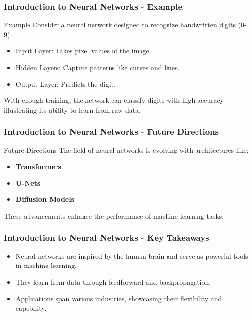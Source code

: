 \documentclass[aspectratio=169]{beamer}
\begin{document}
\begin{frame}[fragile]
    \frametitle{Introduction to Neural Networks - Example}
    \begin{block}{Example}
        Consider a neural network designed to recognize handwritten digits (0-9). 
        \begin{itemize}
            \item Input Layer: Takes pixel values of the image.
            \item Hidden Layers: Capture patterns like curves and lines.
            \item Output Layer: Predicts the digit.
        \end{itemize}
        With enough training, the network can classify digits with high accuracy, illustrating its ability to learn from raw data.
    \end{block}
\end{frame}

\begin{frame}[fragile]
    \frametitle{Introduction to Neural Networks - Future Directions}
    \begin{block}{Future Directions}
        The field of neural networks is evolving with architectures like:
        \begin{itemize}
            \item \textbf{Transformers}
            \item \textbf{U-Nets}
            \item \textbf{Diffusion Models}
        \end{itemize}
        These advancements enhance the performance of machine learning tasks.
    \end{block}
\end{frame}

\begin{frame}[fragile]
    \frametitle{Introduction to Neural Networks - Key Takeaways}
    \begin{itemize}
        \item Neural networks are inspired by the human brain and serve as powerful tools in machine learning.
        \item They learn from data through feedforward and backpropagation.
        \item Applications span various industries, showcasing their flexibility and capability.
    \end{itemize}
\end{frame}
\end{document}
